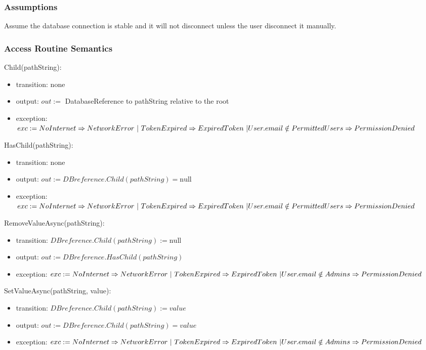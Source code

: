 \documentclass[12pt, titlepage]{article}
\begin{document}
\begin{itemize}
\subsubsection{Assumptions}

Assume the database connection is stable and it will not disconnect unless the user disconnect it manually.

\subsubsection{Access Routine Semantics}

\noindent Child(pathString):
\begin{itemize}
\item transition: none 
\item output: $out :=$ DatabaseReference to pathString relative to the root
\item exception: $exc := NoInternet \Rightarrow NetworkError\ | \ TokenExpired \Rightarrow ExpiredToken\ | \\ User.email \notin PermittedUsers \Rightarrow PermissionDenied$
\end{itemize}

\noindent HasChild(pathString):
\begin{itemize}
\item transition: none 
\item output: $out := DBreference.Child(pathString) = \text{null}$
\item exception: $exc := NoInternet \Rightarrow NetworkError\ | \ TokenExpired \Rightarrow ExpiredToken\ | \\ User.email \notin PermittedUsers \Rightarrow PermissionDenied$
\end{itemize}

\noindent RemoveValueAsync(pathString):
\begin{itemize}
\item transition: $DBreference.Child(pathString) := \text{null}$
\item output: $out := DBreference.HasChild(pathString)$
\item exception: $exc := NoInternet \Rightarrow NetworkError\ | \ TokenExpired \Rightarrow ExpiredToken\ | \\ User.email \notin Admins \Rightarrow PermissionDenied$
\end{itemize}

\noindent SetValueAsync(pathString, value):
\begin{itemize}
\item transition: $DBreference.Child(pathString) := value$
\item output: $out := DBreference.Child(pathString) = value$
\item exception: $exc := NoInternet \Rightarrow NetworkError\ | \ TokenExpired \Rightarrow ExpiredToken\ | \\ User.email \notin Admins \Rightarrow PermissionDenied$
\end{itemize}


\end{itemize}
\end{document}
